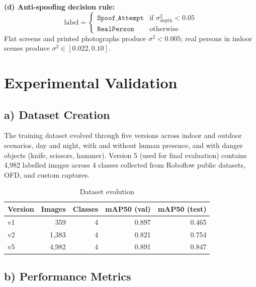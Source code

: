 \documentclass[12pt,a4paper]{article}
\begin{document}
\textbf{(d) Anti-spoofing decision rule:}
\begin{equation}
  \text{label} =
  \begin{cases}
    \texttt{Spoof\_Attempt} & \text{if } \sigma^2_{\text{depth}} < 0.05 \\
    \texttt{RealPerson}     & \text{otherwise}
  \end{cases}
  \label{eq:spoof}
\end{equation}
Flat screens and printed photographs produce $\sigma^2 < 0.005$; real persons in indoor scenes produce $\sigma^2 \in [0.022, 0.10]$.

\section{Experimental Validation}

\subsection*{a) Dataset Creation}

The training dataset evolved through five versions across indoor and outdoor scenarios,
day and night, with and without human presence, and with danger objects (knife, scissors,
hammer). Version 5 (used for final evaluation) contains 4{,}982 labelled images across
4 classes collected from Roboflow public datasets, OFD, and custom captures.

\begin{table}[h]
\centering
\caption{Dataset evolution}
\begin{tabular}{@{}lrrrr@{}}
\toprule
Version & Images & Classes & mAP50 (val) & mAP50 (test) \\
\midrule
v1 & 359    & 4 & 0.897 & 0.465 \\
v2 & 1{,}383 & 4 & 0.821 & 0.754 \\
v5 & 4{,}982 & 4 & 0.891 & 0.847 \\
\bottomrule
\end{tabular}
\end{table}

\subsection*{b) Performance Metrics}
\end{document}
